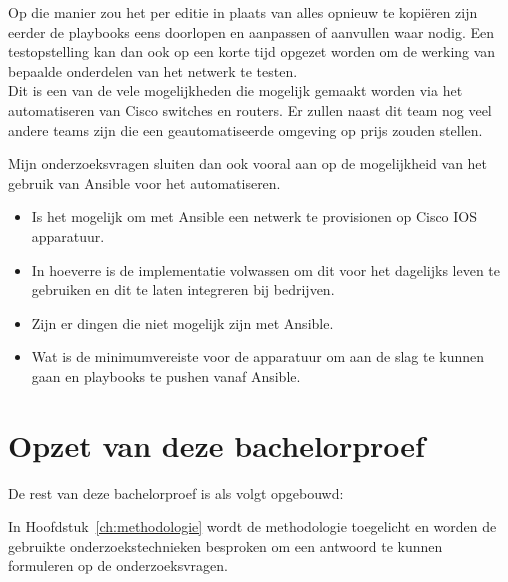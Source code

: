 Op die manier zou het per editie in plaats van alles opnieuw te kopiëren zijn eerder de playbooks eens doorlopen en aanpassen of aanvullen waar nodig. Een testopstelling kan dan ook op een korte tijd opgezet worden om de werking van bepaalde onderdelen van het netwerk te testen.
\\

Dit is een van de vele mogelijkheden die mogelijk gemaakt worden via het automatiseren van Cisco switches en routers. Er zullen naast dit team nog veel andere teams zijn die een geautomatiseerde omgeving op prijs zouden stellen.

Mijn onderzoeksvragen sluiten dan ook vooral aan op de mogelijkheid van het gebruik van Ansible voor het automatiseren.
\begin{itemize}
\item Is het mogelijk om met Ansible een netwerk te provisionen op Cisco IOS apparatuur.
\item In hoeverre is de implementatie volwassen om dit voor het dagelijks leven te gebruiken en dit te laten integreren bij bedrijven.
\item Zijn er dingen die niet mogelijk zijn met Ansible.
\item Wat is de minimumvereiste voor de apparatuur om aan de slag te kunnen gaan en playbooks te pushen vanaf Ansible.
\\
\end{itemize}



\section{Opzet van deze bachelorproef}
\label{sec:opzet-bachelorproef}


De rest van deze bachelorproef is als volgt opgebouwd:

In Hoofdstuk~\ref{ch:methodologie} wordt de methodologie toegelicht en worden de gebruikte onderzoekstechnieken besproken om een antwoord te kunnen formuleren op de onderzoeksvragen.

